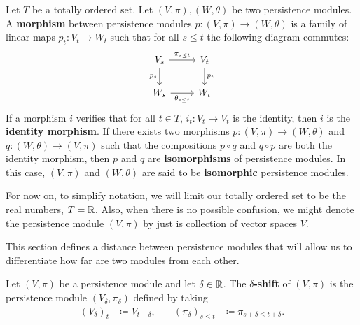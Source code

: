 \begin{definition}
    Let $T$ be a totally ordered set. Let $ (V, \pi), (W, \theta) $ be two persistence modules. A {\bf morphism} between persistence modules $ p \colon (V, \pi) \to (W, \theta) $ is a family of linear maps $ p_t \colon V_t \to W_t $ such that for all $ s \leq t $ the following diagram commutes:
    $$
    \begin{tikzcd}
        V_s \arrow[r, "\pi_{s \leq t}"] \arrow[d, "p_s"'] & V_t \arrow[d, "p_t"] \\
        W_s \arrow[r, "\theta_{s \leq t}"']               & W_t
    \end{tikzcd}
    $$
    If a morphism $ i $ verifies that for all $ t \in T $, $ i_t \colon V_t \to V_t $ is the identity, then $ i $ is the {\bf identity morphism}. If there exists two morphisms $ p \colon (V, \pi) \to (W, \theta) $ and $ q \colon (W, \theta) \to (V, \pi) $ such that the compositions $ p \circ q $ and $ q \circ p $ are both the identity morphism, then $ p $ and $ q $ are {\bf isomorphisms} of persistence modules. In this case, $ (V, \pi) $ and $ (W, \theta) $ are said to be {\bf isomorphic} persistence modules.
\end{definition}

For now on, to simplify notation, we will limit our totally ordered set to be the real numbers, $ T = \mathbb R $. Also, when there is no possible confusion, we might denote the persistence module $ (V, \pi) $ by just is collection of vector spaces $ V $. 

This section defines a distance between persistence modules that will allow us to differentiate how far are two modules from each other.

\begin{definition}
    Let $ (V, \pi) $ be a persistence module and let $ \delta \in \mathbb R $. The {\bf $\delta$-shift} of $ (V, \pi) $ is the persistence module $ (V_\delta, \pi_\delta) $ defined by taking
    \begin{align}
        (V_\delta)_t &\coloneq V_{t+\delta}, \quad & (\pi_\delta)_{s\leq t} &\coloneq \pi_{s+\delta \leq t+\delta}.
    \end{align}
\end{definition}

